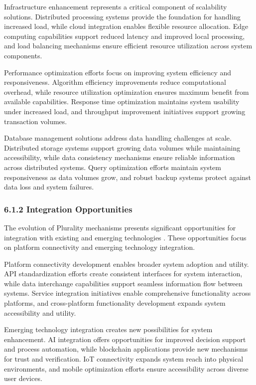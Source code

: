 Infrastructure enhancement represents a critical component of scalability solutions. Distributed processing systems provide the foundation for handling increased load, while cloud integration enables flexible resource allocation. Edge computing capabilities support reduced latency and improved local processing, and load balancing mechanisms ensure efficient resource utilization across system components.

Performance optimization efforts focus on improving system efficiency and responsiveness. Algorithm efficiency improvements reduce computational overhead, while resource utilization optimization ensures maximum benefit from available capabilities. Response time optimization maintains system usability under increased load, and throughput improvement initiatives support growing transaction volumes.

Database management solutions address data handling challenges at scale. Distributed storage systems support growing data volumes while maintaining accessibility, while data consistency mechanisms ensure reliable information across distributed systems. Query optimization efforts maintain system responsiveness as data volumes grow, and robust backup systems protect against data loss and system failures.

\hypertarget{integration-opportunities}{%
\subsubsection{6.1.2 Integration Opportunities}\label{integration-opportunities}}

The evolution of Plurality mechanisms presents significant opportunities for integration with existing and emerging technologies \citep{weyl2022decentralized}. These opportunities focus on platform connectivity and emerging technology integration.

Platform connectivity development enables broader system adoption and utility. API standardization efforts create consistent interfaces for system interaction, while data interchange capabilities support seamless information flow between systems. Service integration initiatives enable comprehensive functionality across platforms, and cross-platform functionality development expands system accessibility and utility.

Emerging technology integration creates new possibilities for system enhancement. AI integration offers opportunities for improved decision support and process automation, while blockchain applications provide new mechanisms for trust and verification. IoT connectivity expands system reach into physical environments, and mobile optimization efforts ensure accessibility across diverse user devices.


